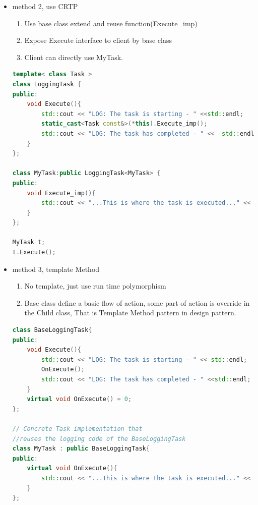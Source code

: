 \documentclass[a4paper,11pt,twoside]{book}
\begin{document}
\begin{itemize}
	\item method 2, use CRTP
	\begin{enumerate}
		\item Use base class extend and reuse function(Execute\_imp)
		\item Expose Execute interface to client by base class 
		\item Client can directly use MyTask.
	\end{enumerate}
\begin{lstlisting}[frame=single, language=c++]
template< class Task >
class LoggingTask {
public:
	void Execute(){
		std::cout << "LOG: The task is starting - " <<std::endl;
		static_cast<Task const&>(*this).Execute_imp();
		std::cout << "LOG: The task has completed - " <<  std::endl;
	}
};
	
class MyTask:public LoggingTask<MyTask> {
public:
	void Execute_imp(){
		std::cout << "...This is where the task is executed..." << std::endl;
	}
};
	
MyTask t;
t.Execute();
\end{lstlisting}
	
	\item method 3, template Method
	\begin{enumerate}
		\item No template, just use run time polymorphism
		\item Base class define a basic flow of action, some part of action is override in the Child class, That is Template Method pattern in design pattern.
	\end{enumerate}
\begin{lstlisting}[frame=single, language=c++]
class BaseLoggingTask{
public:
	void Execute(){
		std::cout << "LOG: The task is starting - " << std::endl;
		OnExecute();
		std::cout << "LOG: The task has completed - " <<std::endl;
	}
	virtual void OnExecute() = 0;
};
	
// Concrete Task implementation that 
//reuses the logging code of the BaseLoggingTask
class MyTask : public BaseLoggingTask{
public:
	virtual void OnExecute(){
		std::cout << "...This is where the task is executed..." << std::endl;
	}
};
	\end{lstlisting}
	

\end{itemize}
\end{document}

